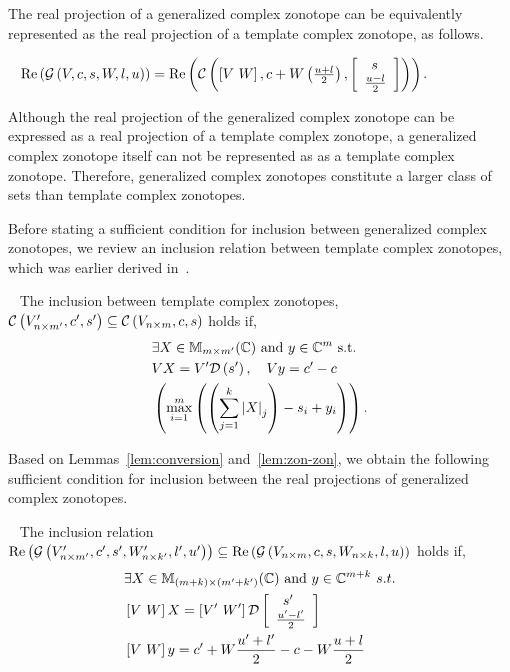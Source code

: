 


The real projection of a generalized complex zonotope can be
equivalently represented as the real projection of a template complex
zonotope, as follows.  
\begin{lemma}~\label{lem:conversion}
$\real\lt(\gcz{V}{c}{s}{W}{l}{u}\rt) = \real\lt(\cz{\lt[V~W\rt]}{c+W\lt(\frac{u+l}{2}\rt)}{\ColumnJoin{\hspace{0.5em}s}{\frac{u-l}{2}}}\rt)$.
\end{lemma}
Although the real projection of the generalized complex zonotope can
be expressed as a real projection of a template complex zonotope, a
generalized complex zonotope itself can not be represented as as a
template complex zonotope.  Therefore, generalized complex zonotopes
constitute a larger class of sets than template complex zonotopes.

Before stating a sufficient condition for inclusion between generalized complex
zonotopes, we review an inclusion relation between template complex
zonotopes, which was earlier derived in~\cite{todo}.
\begin{lemma}~\label{lem:zon-zon} The inclusion between template complex zonotopes,
  $\cz{V^\pr_{n\times m^\pr}}{c^\pr}{s^\pr}\subseteq \cz{V_{n\times m}}{c}{s}$ holds if,
\begin{align}
\begin{split}
& \exists X\in\mat{m}{m^\pr}{\mb{C}}~\text{and}~y\in\mb{C}^{m}~\text{s.t.}\\
& \transfer{V}{V^\pr}{s^\pr}{X},~~~\centertransfer{V}{c}{c^\pr}{y}\\
& \lt(\scalebound{X}{y}{s}{m}{k}\rt).\\
\end{split}
\end{align}
\end{lemma}

Based on Lemmas~\ref{lem:conversion} and~\ref{lem:zon-zon}, we obtain
the following sufficient condition for inclusion between the real
projections of generalized complex zonotopes.
\begin{lemma}~\label{lem:gcz-gcz}
The inclusion relation
$\real\lt(\gcz{V^\pr_{n\times m^\pr}}{c^\pr}{s^\pr}{W^\pr_{n\times k^\pr}}{l^\pr}{u^\pr}\rt)\subseteq
\real\lt(\gcz{V_{n\times m}}{c}{s}{W_{n\times k}}{l}{u}\rt)$ holds if,
\begin{align}
\begin{split}
& \exists X\in\mat{(m+k)}{(m^\pr+k^\pr)}{\mb{C}}~\text{and}~y\in\mb{C}^{m+k}~s.t.\\
& \lt[V~W\rt]X = \lt[V^\pr~W^\pr\rt]\dg\ColumnJoin{\hspace{0.5em}s^\pr}{\frac{u^\pr-l^\pr}{2}}\\
& \lt[V~W\rt]y = c^\pr+W\frac{u^\pr+l^\pr}{2}-c-W\frac{u+l}{2}
\end{split}
\end{align}
\end{lemma}

